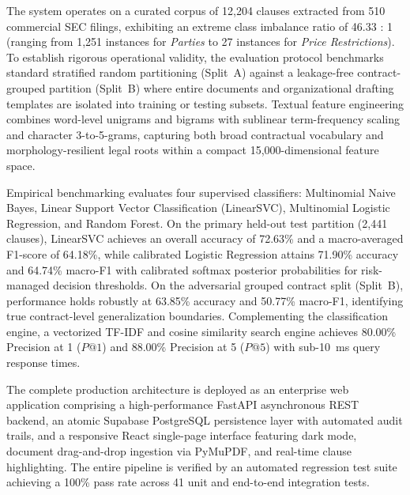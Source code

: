 \vspace{0.35cm}
\noindent The system operates on a curated corpus of 12,204 clauses extracted from 510 commercial SEC filings, exhibiting an extreme class imbalance ratio of 46.33 : 1 (ranging from 1,251 instances for \textit{Parties} to 27 instances for \textit{Price Restrictions}). To establish rigorous operational validity, the evaluation protocol benchmarks standard stratified random partitioning (Split~A) against a leakage-free contract-grouped partition (Split~B) where entire documents and organizational drafting templates are isolated into training or testing subsets. Textual feature engineering combines word-level unigrams and bigrams with sublinear term-frequency scaling and character 3-to-5-grams, capturing both broad contractual vocabulary and morphology-resilient legal roots within a compact 15,000-dimensional feature space.

\vspace{0.35cm}
\noindent Empirical benchmarking evaluates four supervised classifiers: Multinomial Naive Bayes, Linear Support Vector Classification (LinearSVC), Multinomial Logistic Regression, and Random Forest. On the primary held-out test partition (2,441 clauses), LinearSVC achieves an overall accuracy of 72.63\% and a macro-averaged F1-score of 64.18\%, while calibrated Logistic Regression attains 71.90\% accuracy and 64.74\% macro-F1 with calibrated softmax posterior probabilities for risk-managed decision thresholds. On the adversarial grouped contract split (Split~B), performance holds robustly at 63.85\% accuracy and 50.77\% macro-F1, identifying true contract-level generalization boundaries. Complementing the classification engine, a vectorized TF-IDF and cosine similarity search engine achieves 80.00\% Precision at 1 ($P@1$) and 88.00\% Precision at 5 ($P@5$) with sub-10~ms query response times.

\vspace{0.35cm}
\noindent The complete production architecture is deployed as an enterprise web application comprising a high-performance FastAPI asynchronous REST backend, an atomic Supabase PostgreSQL persistence layer with automated audit trails, and a responsive React single-page interface featuring dark mode, document drag-and-drop ingestion via PyMuPDF, and real-time clause highlighting. The entire pipeline is verified by an automated regression test suite achieving a 100\% pass rate across 41 unit and end-to-end integration tests.

\newpage
{}
{}
\listoftables

